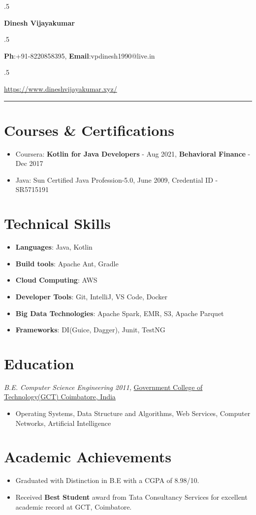 \documentclass[10pt]{article}
\begin{document}
\moveleft.5\hoffset\centerline{\huge\bf Dinesh Vijayakumar} %
\moveleft.5\hoffset\centerline{{\bf Ph}:+91-8220858395, {\bf Email}:vpdinesh1990@live.in}
\moveleft.5\hoffset\centerline{\href{https://www.dineshvijayakumar.xyz/}{https://www.dineshvijayakumar.xyz/}}
\hrule

\begin{minipage}[t]{0.40\textwidth}
\vspace{5pt}

\section*{Courses \& Certifications}
\begin{itemize}
\item Coursera: {\bf Kotlin for Java Developers} - Aug 2021, {\bf Behavioral Finance} - Dec 2017
\item Java: Sun Certified Java Profession-5.0, June 2009, Credential ID - SR5715191
\end{itemize}

\section*{Technical Skills}
\begin{itemize}
\item {\bf Languages}: Java, Kotlin
\item {\bf Build tools}: Apache Ant, Gradle
\item {\bf Cloud Computing}: AWS
\item {\bf Developer Tools}: Git, IntelliJ, VS Code, Docker
\item {\bf Big Data Technologies}: Apache Spark, EMR, S3, Apache Parquet
\item {\bf Frameworks}: DI(Guice, Dagger), Junit, TestNG 
\end{itemize}
\section*{Education}
{\sl B.E. Computer Science Engineering 2011,} \href{https://gct.ac.in/}{Government College of Technology(GCT) Coimbatore, India} 
\begin{itemize}
\item Operating Systems, Data Structure and Algorithms, Web Services, Computer Networks, Artificial Intelligence
\end{itemize}
 

\section*{Academic Achievements}
\begin{itemize}
\item Graduated with Distinction in B.E with a CGPA of 8.98/10.
\item Received {\bf Best Student} award from Tata Consultancy Services for excellent academic record at GCT, Coimbatore.
\end{itemize}


\end{minipage}
\end{document}
